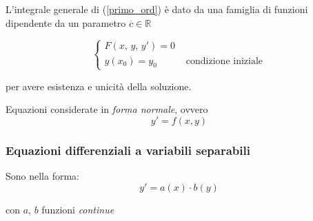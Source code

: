 \begin{proposition}
    L’integrale generale di \textnormal{(\ref{primo_ord})} è dato da una famiglia di funzioni dipendente da un parametro $\overline{c} \in \mathbb{R}$

    \begin{equation}
        \begin{cases}
            F(x, \, y,\, y') = 0\\
            y(x_0) = y_0 \hspace{3em}  \mbox{condizione iniziale}
        \end{cases}
    \end{equation}

    per avere esistenza e unicità della soluzione.
\end{proposition}

Equazioni considerate in \emph{forma normale}, ovvero
\begin{equation}
    y' = f(x, y)
\end{equation}

\subsubsection{Equazioni differenziali a variabili separabili}
Sono nella forma:
\begin{equation}
    y' = a(x)\cdot b(y)
\end{equation}

con $a$, $b$ funzioni \emph{continue}

